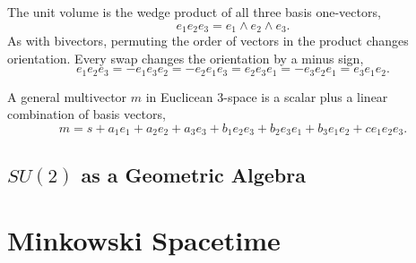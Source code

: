 	The unit volume is the wedge product of all three basis one-vectors,
	\[
	e_1e_2e_3 = e_1 \wedge e_2 \wedge e_3.  
	\]
	As with bivectors, permuting the order of vectors in the product changes orientation. Every swap changes the orientation by a minus sign,
	\[
	e_1e_2e_3 = -e_1e_3e_2 = -e_2e_1e_3 = e_2e_3e_1 = -e_3e_2e_1 = e_3e_1e_2.
	\]
	
	A general multivector $m$ in Euclicean 3-space is a scalar plus a linear combination of basis vectors,
	\[
	m = s + a_1e_1 + a_2e_2 + a_3e_3 + b_1e_2e_3 + b_2e_3e_1 + b_3e_1e_2 + ce_1e_2e_3.
	\] 
	\subsection{$SU(2)$ as a Geometric Algebra}
	
	\section{Minkowski Spacetime}